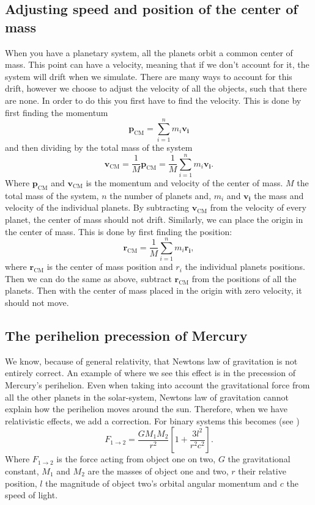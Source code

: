 \documentclass[reprint, english,notitlepage,nofootinbib]{revtex4-1}  %
\begin{document}
\subsection{Adjusting speed and position of the center of mass}
When you have a planetary system, all the planets orbit a common center of mass. This point can have a velocity, meaning that if we don't account for it, the system will drift when we simulate. There are many ways to account for this drift, however we choose to adjust the velocity of all the objects, such that there are none. In order to do this you first have to find the velocity. This is done by first finding the momentum
\begin{equation*}
	\mathbf{p}_{\text{CM}} = \sum_{i=1}^{n}m_i\mathbf{v_i}
\end{equation*} 
and then dividing by the total mass of the system
\begin{equation}
	\label{eq:v_cm}
	\mathbf{v}_{\text{CM}} = \frac{1}{M}\mathbf{p}_{\text{CM}} =  \frac{1}{M}\sum_{i=1}^{n}m_i\mathbf{v_i}.
\end{equation} 
Where $\mathbf{p}_{\text{CM}}$ and $\mathbf{v}_{\text{CM}}$ is the momentum and velocity of the center of mass. $M$ the total mass of the system, $n$ the number of planets and, $m_i$ and $\mathbf{v_i}$ the mass and velocity of the individual planets. By subtracting $\mathbf{v}_{\text{CM}}$ from the velocity of every planet, the center of mass should not drift. Similarly, we can place the origin in the center of mass. This is done by first finding the position:
\begin{equation}
	\label{eq:r_cm}
	\mathbf{r}_{\text{CM}} =  \frac{1}{M}\sum_{i=1}^{n}m_i\mathbf{r_i},
\end{equation}
where $\mathbf{r}_{\text{CM}}$ is the center of mass position and $r_i$ the individual planets positions. Then we can do the same as above, subtract $\mathbf{r}_{\text{CM}}$ from the positions of all the planets. Then with the center of mass placed in the origin with zero velocity, it should not move.

\subsection{The perihelion precession of Mercury}
We know, because of general relativity, that Newtons law of gravitation is not entirely correct. An example of where we see this effect is in the precession of Mercury's perihelion. Even when taking into account the gravitational force from all the other planets in the solar-system, Newtons law of gravitation cannot explain how the perihelion moves around the sun. Therefore, when we have relativistic effects, we add a correction. For binary systems this becomes (see \citep{oppgavetekst})
\begin{equation}
	\label{eq:general_relativity}
	F_{1 \rightarrow 2} = \frac{GM_1M_2}{r^2}\left[ 1 + \frac{3l^2}{r^2c^2} \right].
\end{equation}
Where $F_{1 \rightarrow 2}$ is the force acting from object one on two, $G$ the gravitational constant, $M_1$ and $M_2$ are the masses of object one and two, $r$ their relative position, $l$ the magnitude of object two's orbital angular momentum and $c$ the speed of light.
\end{document}
